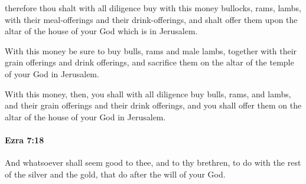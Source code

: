 			\begin{versebox}
					\item[BHS] 
					\item[LXX] 
					\item[ASV] therefore thou shalt with all diligence buy with this money bullocks, rams, lambs, with their meal-offerings and their drink-offerings, and shalt offer them upon the altar of the house of your God which is in Jerusalem.
					\item[NIV] With this money be sure to buy bulls, rams and male lambs, together with their grain offerings and drink offerings, and sacrifice them on the altar of the temple of your God in Jerusalem.
					\item[NRSV] With this money, then, you shall with all diligence buy bulls, rams, and lambs, and their grain offerings and their drink offerings, and you shall offer them on the altar of the house of your God in Jerusalem.
			\end{versebox}

		\paragraph{Ezra 7:18} %
			\label{EZRA-7-18}

			And whatsoever shall seem good to thee, and to thy brethren, to do with the rest of the silver and the gold, that do after the will of your God.

